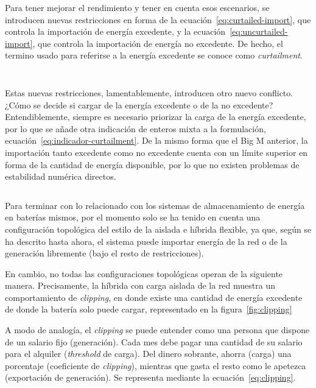 Para tener mejorar el rendimiento y tener en cuenta esos escenarios, se introducen nuevas restricciones en forma de la ecuación~\ref{eq:curtailed-import}, que controla la importación de energía excedente, y la ecuación~\ref{eq:uncurtailed-import}, que controla la importación de energía no excedente. De hecho, el termino usado para referirse a la energía excedente se conoce como \textit{curtailment}.

\begin{equation}%
  \label{eq:curtailed-import}
\end{equation}

\begin{equation}%
  \label{eq:uncurtailed-import}
\end{equation}

Estas nuevas restricciones, lamentablemente, introducen otro nuevo conflicto. ¿Cómo se decide si cargar de la energía excedente o de la no excedente? Entendiblemente, siempre es necesario priorizar la carga de la energía excedente, por lo que se añade otra indicación de enteros mixta a la formulación, ecuación~\ref{eq:indicador-curtailment}. De la mismo forma que el Big M anterior, la importación tanto excedente como no excedente cuenta con un límite superior en forma de la cantidad de energía disponible, por lo que no existen problemas de estabilidad numérica directos.

\begin{equation}%
  \label{eq:indicador-curtailment}
\end{equation}

Para terminar con lo relacionado con los sistemas de almacenamiento de energía en baterías mismos, por el momento solo se ha tenido en cuenta una configuración topológica del estilo de la aislada e híbrida flexible, ya que, según se ha descrito hasta ahora, el sistema puede importar energía de la red o de la generación libremente (bajo el resto de restricciones).

En cambio, no todas las configuraciones topológicas operan de la siguiente manera. Precisamente, la híbrida con carga aislada de la red muestra un comportamiento de \textit{clipping}, en donde existe una cantidad de energía excedente de donde la batería solo puede cargar, representado en la figura~\ref{fig:clipping}

A modo de analogía, el \textit{clipping} se puede entender como una persona que dispone de un salario fijo (generación). Cada mes debe pagar una cantidad de su salario para el alquiler (\textit{threshold} de carga). Del dinero sobrante, ahorra (carga) una porcentaje (coeficiente de \textit{clipping}), mientras que gasta el resto como le apetezca (exportación de generación). Se representa mediante la ecuación~\ref{eq:clipping}.

